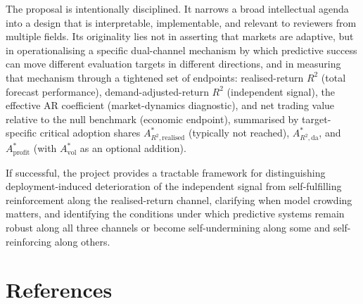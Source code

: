 \documentclass[11pt]{article}
\begin{document}
The proposal is intentionally disciplined. It narrows a broad intellectual agenda into a design that is interpretable, implementable, and relevant to reviewers from multiple fields. Its originality lies not in asserting that markets are adaptive, but in operationalising a specific dual-channel mechanism by which predictive success can move different evaluation targets in different directions, and in measuring that mechanism through a tightened set of endpoints: realised-return $R^{2}$ (total forecast performance), demand-adjusted-return $R^{2}$ (independent signal), the effective AR coefficient (market-dynamics diagnostic), and net trading value relative to the null benchmark (economic endpoint), summarised by target-specific critical adoption shares $A^{*}_{R^{2},\mathrm{realised}}$ (typically not reached), $A^{*}_{R^{2},\mathrm{da}}$, and $A^{*}_{\mathrm{profit}}$ (with $A^{*}_{\mathrm{vol}}$ as an optional addition).

If successful, the project provides a tractable framework for distinguishing deployment-induced deterioration of the independent signal from self-fulfilling reinforcement along the realised-return channel, clarifying when model crowding matters, and identifying the conditions under which predictive systems remain robust along all three channels or become self-undermining along some and self-reinforcing along others.


\section*{References}
\end{document}
